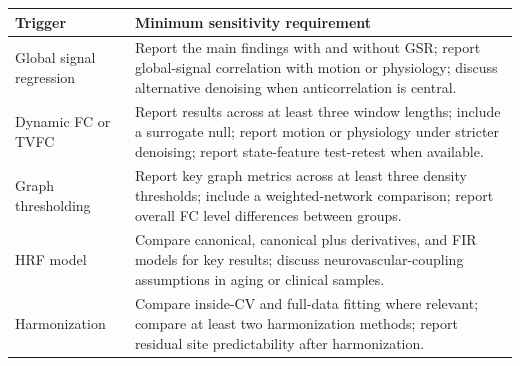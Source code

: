\begin{longtable}{|>{\RaggedRight\hspace{0pt}\arraybackslash}p{}|>{\RaggedRight\hspace{0pt}\arraybackslash}p{}|}
\hline
\rowcolor{brtablehead}\textbf{Trigger} & \textbf{Minimum sensitivity requirement} \\
\hline
Global signal regression & Report the main findings with and without GSR; report global-signal correlation with motion or physiology; discuss alternative denoising when anticorrelation is central. \\
\hline
Dynamic FC or TVFC & Report results across at least three window lengths; include a surrogate null; report motion or physiology under stricter denoising; report state-feature test-retest when available. \\
\hline
Graph thresholding & Report key graph metrics across at least three density thresholds; include a weighted-network comparison; report overall FC level differences between groups. \\
\hline
HRF model & Compare canonical, canonical plus derivatives, and FIR models for key results; discuss neurovascular-coupling assumptions in aging or clinical samples. \\
\hline
Harmonization & Compare inside-CV and full-data fitting where relevant; compare at least two harmonization methods; report residual site predictability after harmonization. \\
\hline
\end{longtable}

\clearpage
